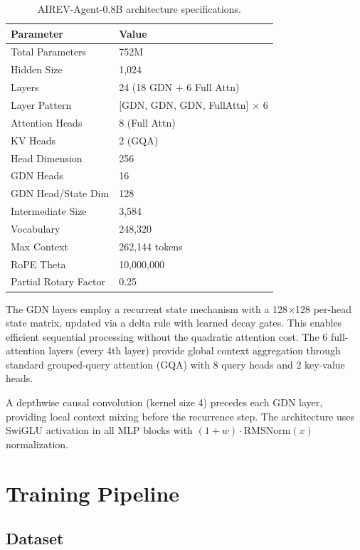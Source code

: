 \documentclass[10pt,twocolumn]{article}
\begin{document}
\begin{table}[!htbp]
\centering
\caption{AIREV-Agent-0.8B architecture specifications.}
\label{tab:arch}
\begin{tabular}{ll}
\toprule
\textbf{Parameter} & \textbf{Value} \\
\midrule
Total Parameters & 752M \\
Hidden Size & 1,024 \\
Layers & 24 (18 GDN + 6 Full Attn) \\
Layer Pattern & [GDN, GDN, GDN, FullAttn] $\times$ 6 \\
Attention Heads & 8 (Full Attn) \\
KV Heads & 2 (GQA) \\
Head Dimension & 256 \\
GDN Heads & 16 \\
GDN Head/State Dim & 128 \\
Intermediate Size & 3,584 \\
Vocabulary & 248,320 \\
Max Context & 262,144 tokens \\
RoPE Theta & 10,000,000 \\
Partial Rotary Factor & 0.25 \\
\bottomrule
\end{tabular}
\end{table}

The GDN layers employ a recurrent state mechanism with a 128$\times$128 per-head state matrix, updated via a delta rule with learned decay gates. This enables efficient sequential processing without the quadratic attention cost. The 6 full-attention layers (every 4th layer) provide global context aggregation through standard grouped-query attention (GQA) with 8 query heads and 2 key-value heads.

A depthwise causal convolution (kernel size 4) precedes each GDN layer, providing local context mixing before the recurrence step. The architecture uses SwiGLU activation \citep{shazeer2020glu} in all MLP blocks with $(1+w) \cdot \text{RMSNorm}(x)$ normalization.

\section{Training Pipeline}

\subsection{Dataset}
\end{document}
